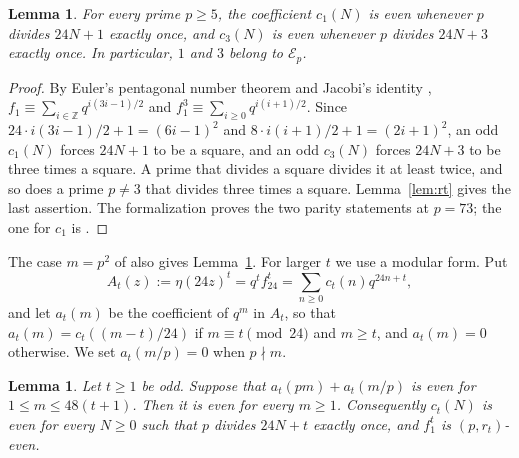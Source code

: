 \documentclass[12pt]{amsart}
\newtheorem{lemma}[theorem]{Lemma}
\theoremstyle{definition}
\newcommand{\Z}{\mathbb{Z}}
\newcommand{\cE}{\mathcal{E}}
\newcommand{\lean}[1]{\ignorespaces}
\newcommand{\computed}[2]{\ignorespaces}
\begin{document}
\begin{lemma}\label{lem:t13}
\lean{\decl{KeithZanello.condG_one} and \decl{KeithZanello.condG_three}, at $p=73$; Jacobi's identity modulo 2 is \decl{KeithZanello.jacobi_mod_two}}
For every prime $p\ge5$, the coefficient $c_1(N)$ is even whenever $p$ divides $24N+1$ exactly once, and $c_3(N)$ is even whenever $p$ divides $24N+3$ exactly once. In particular, $1$ and $3$ belong to $\cE_p$.
\end{lemma}

\begin{proof}
By Euler's pentagonal number theorem and Jacobi's identity \cite[Theorem~27]{KZ3}, $f_1\equiv\sum_{i\in\Z}q^{i(3i-1)/2}$ and $f_1^3\equiv\sum_{i\ge0}q^{i(i+1)/2}$. Since $24\cdot i(3i-1)/2+1=(6i-1)^2$ and $8\cdot i(i+1)/2+1=(2i+1)^2$, an odd $c_1(N)$ forces $24N+1$ to be a square, and an odd $c_3(N)$ forces $24N+3$ to be three times a square. A prime that divides a square divides it at least twice, and so does a prime $p\ne3$ that divides three times a square. Lemma~\ref{lem:rt} gives the last assertion. The formalization proves the two parity statements at $p=73$; the one for $c_1$ is .
\end{proof}

The case $m=p^2$ of \cite[Theorems~15 and~16]{KZ3} also gives Lemma~\ref{lem:t13}. For larger $t$ we use a modular form. Put
\[
A_t(z):=\eta(24z)^t=q^tf_{24}^t=\sum_{n\ge0}c_t(n)q^{24n+t},
\]
and let $a_t(m)$ be the coefficient of $q^m$ in $A_t$, so that $a_t(m)=c_t((m-t)/24)$ if $m\equiv t\pmod{24}$ and $m\ge t$, and $a_t(m)=0$ otherwise. We set $a_t(m/p)=0$ when $p\nmid m$.

\begin{lemma}\label{lem:sturm}
\lean{\decl{KeithZanello.sturmHypothesis_proved}, for every prime $p\ge5$, through \decl{KeithZanello.Modular.sturm_level_nine}, which works on $\Gamma_0(9)$ with the bound $4t$ (paper, Section~\ref{sec:checks}); the consequence at $p=73$ is \decl{KeithZanello.condG_of_hecke}}
\computed{gp -q paper/small_checks.gp, parts 5 and 7 (the Sturm bound, and the weight, level and character of $H_t$ for $t\ge5$ in $\mathcal{E}_{73}$ and $\mathcal{E}_{97}$)}{paper/small_checks.out}
Let $t\ge1$ be odd. Suppose that $a_t(pm)+a_t(m/p)$ is even for $1\le m\le48(t+1)$. Then it is even for every $m\ge1$. Consequently $c_t(N)$ is even for every $N\ge0$ such that $p$ divides $24N+t$ exactly once, and $f_1^t$ is $(p,r_t)$-even.
\end{lemma}
\end{document}
